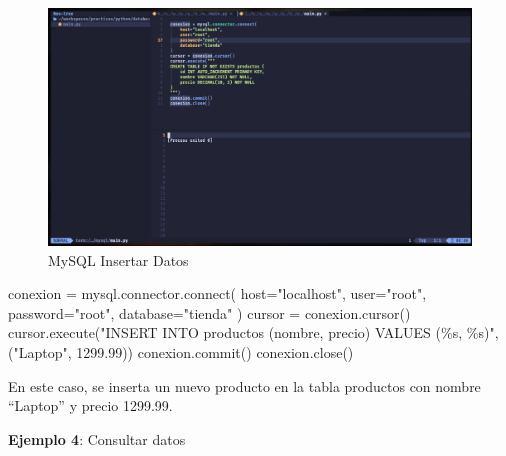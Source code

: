 \documentclass[
  a4paper,
  DIV=11,
  numbers=noendperiod,
  onepage,
  openany]{scrreprt}
\newenvironment{Shaded}{\begin{snugshade}}{\end{snugshade}}
\newcommand{\ExtensionTok}[1]{\textcolor[rgb]{0.00,0.23,0.31}{#1}}
\newcommand{\FloatTok}[1]{\textcolor[rgb]{0.68,0.00,0.00}{#1}}
\newcommand{\NormalTok}[1]{\textcolor[rgb]{0.00,0.23,0.31}{#1}}
\newcommand{\OperatorTok}[1]{\textcolor[rgb]{0.37,0.37,0.37}{#1}}
\newcommand{\SpecialCharTok}[1]{\textcolor[rgb]{0.37,0.37,0.37}{#1}}
\newcommand{\StringTok}[1]{\textcolor[rgb]{0.13,0.47,0.30}{#1}}
\begin{document}
\begin{figure}[H]

{\centering \includegraphics[width=8.33333in,height=\textheight,keepaspectratio]{unidades/unidad6/./images/mysql_code002.png}

}

\caption{MySQL Insertar Datos}

\end{figure}%

\begin{Shaded}
\begin{Highlighting}[]
\NormalTok{conexion }\OperatorTok{=}\NormalTok{ mysql.connector.}\ExtensionTok{connect}\NormalTok{(}
\NormalTok{    host}\OperatorTok{=}\StringTok{"localhost"}\NormalTok{,}
\NormalTok{    user}\OperatorTok{=}\StringTok{"root"}\NormalTok{,}
\NormalTok{    password}\OperatorTok{=}\StringTok{"root"}\NormalTok{,}
\NormalTok{    database}\OperatorTok{=}\StringTok{"tienda"}
\NormalTok{)}
\NormalTok{cursor }\OperatorTok{=}\NormalTok{ conexion.cursor()}
\NormalTok{cursor.execute(}\StringTok{"INSERT INTO productos (nombre, precio) VALUES (}\SpecialCharTok{\%s}\StringTok{, }\SpecialCharTok{\%s}\StringTok{)"}\NormalTok{, (}\StringTok{"Laptop"}\NormalTok{, }\FloatTok{1299.99}\NormalTok{))}
\NormalTok{conexion.commit()}
\NormalTok{conexion.close()}
\end{Highlighting}
\end{Shaded}

En este caso, se inserta un nuevo producto en la tabla productos con
nombre ``Laptop'' y precio 1299.99.

\textbf{Ejemplo 4}: Consultar datos
\end{document}
